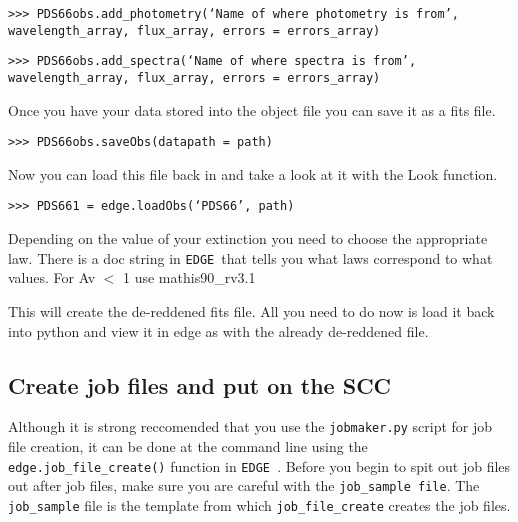 \documentclass{article}
\newcommand{\edge}{\texttt{EDGE }}
\begin{document}
\vspace{2mm}
\texttt{>>> PDS66obs.add\_photometry(`Name of where photometry is from',}\\
\texttt{wavelength\_array, flux\_array, errors = errors\_array)}
\vspace{2mm}

\vspace{2mm}
\texttt{>>> PDS66obs.add\_spectra(`Name of where spectra is from',}\\
\texttt{wavelength\_array, flux\_array, errors = errors\_array)}
\vspace{2mm}

\noindent Once you have your data stored into the object file you can save it as a fits file.  

\vspace{2mm}
\texttt{>>> PDS66obs.saveObs(datapath = path)}
\vspace{2mm}

\noindent Now you can load this file back in and take a look at it with the Look function.

\vspace{2mm}
\texttt{>>> PDS661 = edge.loadObs(`PDS66', path)}
\vspace{2mm}



	 
\noindent Depending on the value of your extinction you need to choose the appropriate law. There is a doc string in \edge that tells you what laws correspond to what values. For Av $<$ 1 use mathis90\_rv3.1


\noindent This will create the de-reddened fits file. All you need to do now is load it back into python and view it in edge as with the already de-reddened file. 

\subsection{Create job files and put on the SCC}

Although it is strong reccomended that you use the \texttt{jobmaker.py} script for job file creation, it can be done at the command line using the \texttt{edge.job\_file\_create()} function in \edge. Before you begin to spit out job files out after job files, make sure you are careful with the \texttt{job\_sample file}. The \texttt{job\_sample} file is the template from which \texttt{job\_file\_create} creates the job files. 
\end{document}
